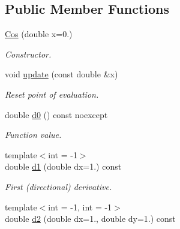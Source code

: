 \subsection*{Public Member Functions}
\begin{DoxyCompactItemize}
\item 
\hyperlink{structRFFGen_1_1CMath_1_1Cos_a950dc0fac1e6a0df91e9beb863af9bee}{Cos} (double x=0.)
\begin{DoxyCompactList}\small\item\em Constructor. \end{DoxyCompactList}\item 
\hypertarget{structRFFGen_1_1CMath_1_1Cos_a2e962b36f84ff276ce63f6bc95d45d04}{void \hyperlink{structRFFGen_1_1CMath_1_1Cos_a2e962b36f84ff276ce63f6bc95d45d04}{update} (const double \&x)}\label{structRFFGen_1_1CMath_1_1Cos_a2e962b36f84ff276ce63f6bc95d45d04}

\begin{DoxyCompactList}\small\item\em Reset point of evaluation. \end{DoxyCompactList}\item 
\hypertarget{structRFFGen_1_1CMath_1_1Cos_a1e5a7d92737ed35ce3c4d3fb5029ba2b}{double \hyperlink{structRFFGen_1_1CMath_1_1Cos_a1e5a7d92737ed35ce3c4d3fb5029ba2b}{d0} () const noexcept}\label{structRFFGen_1_1CMath_1_1Cos_a1e5a7d92737ed35ce3c4d3fb5029ba2b}

\begin{DoxyCompactList}\small\item\em Function value. \end{DoxyCompactList}\item 
\hypertarget{structRFFGen_1_1CMath_1_1Cos_a6813667a131ef0bbf0f8e9acfa7a0575}{{\footnotesize template$<$int  = -\/1$>$ }\\double \hyperlink{structRFFGen_1_1CMath_1_1Cos_a6813667a131ef0bbf0f8e9acfa7a0575}{d1} (double dx=1.) const }\label{structRFFGen_1_1CMath_1_1Cos_a6813667a131ef0bbf0f8e9acfa7a0575}

\begin{DoxyCompactList}\small\item\em First (directional) derivative. \end{DoxyCompactList}\item 
\hypertarget{structRFFGen_1_1CMath_1_1Cos_a748913aa69e699b9d563ed0f44e56384}{{\footnotesize template$<$int  = -\/1, int  = -\/1$>$ }\\double \hyperlink{structRFFGen_1_1CMath_1_1Cos_a748913aa69e699b9d563ed0f44e56384}{d2} (double dx=1., double dy=1.) const }\label{structRFFGen_1_1CMath_1_1Cos_a748913aa69e699b9d563ed0f44e56384}


\end{DoxyCompactItemize}
